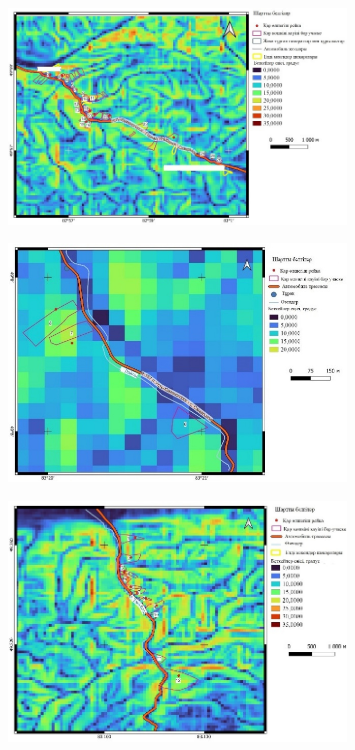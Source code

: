 \begin{figure}[H]
	\centering
	\includegraphics[width=0.8\textwidth]{media/ict2/image220}
	\caption*{}
\end{figure}

\begin{figure}[H]
	\centering
	\includegraphics[width=0.8\textwidth]{media/ict2/image221}
	\caption*{}
\end{figure}

\begin{figure}[H]
	\centering
	\includegraphics[width=0.8\textwidth]{media/ict2/image222}
	\caption*{}
\end{figure}

